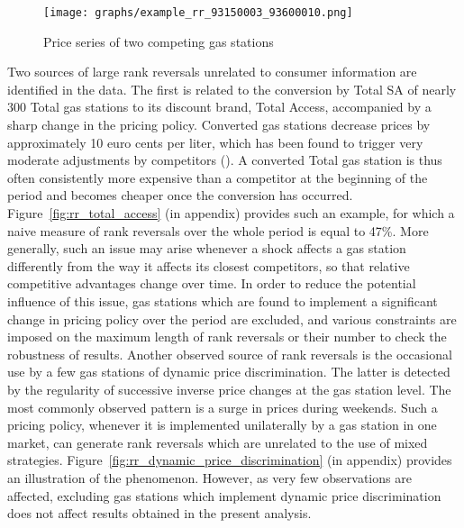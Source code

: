 \documentclass[english]{article}
\begin{document}
\begin{figure}[htb!]
    \caption{Price series of two competing gas stations}
	\centering
		\texttt{[image: graphs/example\_rr\_93150003\_93600010.png]}
\label{fig:rr_pair_example}
\end{figure}

Two sources of large rank reversals unrelated to consumer information are identified in the data. The first is related to the conversion by Total SA of nearly 300 Total gas stations to its discount brand, Total Access, accompanied by a sharp change in the pricing policy. Converted gas stations decrease prices by approximately 10 euro cents per liter, which has been found to trigger very moderate adjustments by competitors (\cite{CHA16}). A converted Total gas station is thus often consistently more expensive than a competitor at the beginning of the period and becomes cheaper once the conversion has occurred. Figure~\ref{fig:rr_total_access} (in appendix) provides such an example, for which a naive measure of rank reversals over the whole period is equal to 47\%. More generally, such an issue may arise whenever a shock affects a gas station differently from the way it affects its closest competitors, so that relative competitive advantages change over time. In order to reduce the potential influence of this issue, gas stations which are found to implement a significant change in pricing policy over the period are excluded, and various constraints are imposed on the maximum length of rank reversals or their number to check the robustness of results. Another observed source of rank reversals is the occasional use by a few gas stations of dynamic price discrimination. The latter is detected by the regularity of successive inverse price changes at the gas station level. The most commonly observed pattern is a surge in prices during weekends. Such a pricing policy, whenever it is implemented unilaterally by a gas station in one market, can generate rank reversals which are unrelated to the use of mixed strategies. Figure~\ref{fig:rr_dynamic_price_discrimination} (in appendix) provides an illustration of the phenomenon. However, as very few observations are affected, excluding gas stations which implement dynamic price discrimination does not affect results obtained in the present analysis.
\end{document}
